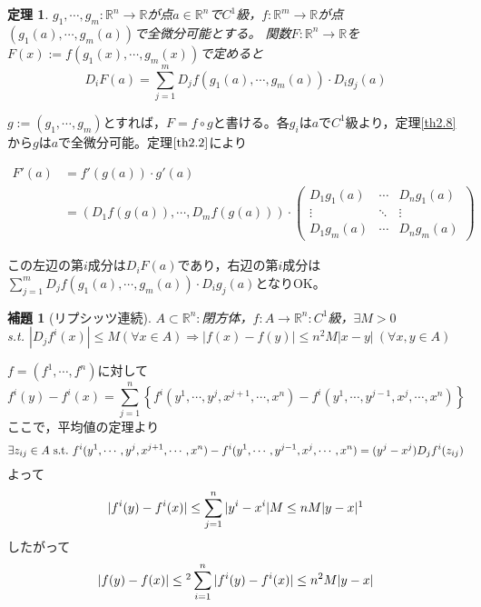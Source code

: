 \documentclass[dvipdfmx,a4j,10pt]{jsarticle}
\makeatletter
\theoremstyle{mystyle1}
\newtheorem{thm}[dfn]{定理}
\newtheorem{lem}[dfn]{補題}
\theoremstyle{mystyle2}
\renewenvironment{proof}[1][\proofname]{\par
  \pushQED{\qed}%
  \normalfont
  \topsep6\p@\@plus6\p@ \trivlist
  \item[\hskip\labelsep{\bfseries\sffamily #1}]\ignorespaces
}{%
  \popQED\endtrivlist\@endpefalse
}
\renewcommand\proofname{証明}
\makeatother
\begin{document}
\begin{framed}
	\begin{thm}\label{th2.9}
		$g_1,\cdots,g_m:\mathbb{R}^n\to\mathbb{R}$が点$a\in\mathbb{R}^n$で$C^1$級，$f:\mathbb{R}^m\to\mathbb{R}$が点$(g_1(a),\cdots,g_m(a))$で全微分可能とする。
		関数$F:\mathbb{R}^n\to\mathbb{R}$を$F(x):=f(g_1(x),\cdots,g_m(x))$で定めると
		\[
		D_iF(a)=\sum_{j=1}^mD_jf(g_1(a),\cdots,g_m(a))\cdot D_ig_j(a)
		\]
	\end{thm}
\end{framed}

\begin{proof}
	$g:=(g_1,\cdots,g_m)$とすれば，$F=f\circ g$と書ける。各$g_i$は$a$で$C^1$級より，定理\ref{th2.8}から$g$は$a$で全微分可能。定理$\ref{th2.2}$により

	\[
	\begin{split}
	F'(a)&=f'(g(a))\cdot g'(a)\\
	&=(D_1f(g(a)),\cdots,D_mf(g(a)))\cdot
	\begin{pmatrix}
		D_1g_1(a) & \cdots & D_ng_1(a)\\
		\vdots & \ddots & \vdots \\
		D_1g_m(a) & \cdots & D_ng_m(a)
	\end{pmatrix}
	\end{split}
	\]

この左辺の第$i$成分は$D_iF(a)$であり，右辺の第$i$成分は$\displaystyle\sum_{j=1}^m D_jf(g_1(a),\cdots,g_m(a))\cdot D_ig_j(a)$となりOK。
\end{proof}

\newpage

\begin{framed}
	\begin{lem}[リプシッツ連続\footnotemark]\label{lem2.10}
		$A\subset\mathbb{R}^n:$閉方体，$f:A\to\mathbb{R}^n:C^1$級，$\exists M>0$\\ s.t. $|D_jf^i(x)|\leq M(\forall x\in A) \Rightarrow |f(x)-f(y)|\leq n^2 M|x-y|\ (\forall x,y\in A)$
	\end{lem}
\end{framed}
\begin{proof}
	$f=(f^1,\cdots,f^n)$に対して
	\[
	f^i(y)-f^i(x)=\sum_{j=1}^n\left\{f^i(y^1,\cdots,y^j,x^{j+1},\cdots,x^n)-f^i(y^1,\cdots,y^{j-1},x^j,\cdots,x^n)\right\}
	\]
	ここで，平均値の定理より
	\[
	\exists z_{ij}\in A\ {\rm s.t.}\ f^i(y^1,\cdots,y^j,x^{j+1},\cdots,x^n)-f^i(y^1,\cdots,y^{j-1},x^j,\cdots,x^n)=(y^j-x^j)D_jf^i(z_{ij})
	\]
	よって
	\[
	|f^i(y)-f^i(x)|\leq\sum_{j=1}^n|y^i-x^i|M\leq nM|y-x|\footnotemark
	\]
	したがって
	\[
	|f(y)-f(x)|\leq\footnotemark\sum_{i=1}^n|f^i(y)-f^i(x)|\leq n^2M|y-x|
	\]
\end{proof}
\end{document}
